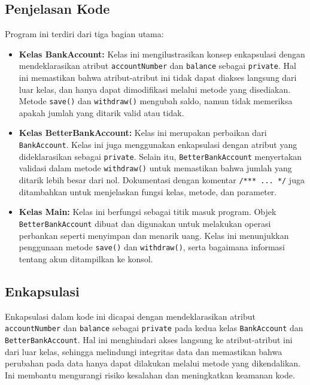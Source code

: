 \subsection{Penjelasan Kode}

Program ini terdiri dari tiga bagian utama:

\begin{itemize}
	\item \textbf{Kelas BankAccount:} Kelas ini mengilustrasikan konsep enkapsulasi dengan mendeklarasikan atribut \texttt{accountNumber} dan \texttt{balance} sebagai \texttt{private}. Hal ini memastikan bahwa atribut-atribut ini tidak dapat diakses langsung dari luar kelas, dan hanya dapat dimodifikasi melalui metode yang disediakan. Metode \texttt{save()} dan \texttt{withdraw()} mengubah saldo, namun tidak memeriksa apakah jumlah yang ditarik valid atau tidak.
	\item \textbf{Kelas BetterBankAccount:} Kelas ini merupakan perbaikan dari \texttt{BankAccount}. Kelas ini juga menggunakan enkapsulasi dengan atribut yang dideklarasikan sebagai \texttt{private}. Selain itu, \texttt{BetterBankAccount} menyertakan validasi dalam metode \texttt{withdraw()} untuk memastikan bahwa jumlah yang ditarik lebih besar dari nol. Dokumentasi dengan komentar \texttt{/*** ... */} juga ditambahkan untuk menjelaskan fungsi kelas, metode, dan parameter.
	\item \textbf{Kelas Main:} Kelas ini berfungsi sebagai titik masuk program. Objek \texttt{BetterBankAccount} dibuat dan digunakan untuk melakukan operasi perbankan seperti menyimpan dan menarik uang. Kelas ini menunjukkan penggunaan metode \texttt{save()} dan \texttt{withdraw()}, serta bagaimana informasi tentang akun ditampilkan ke konsol.
\end{itemize}

\subsection{Enkapsulasi}

Enkapsulasi dalam kode ini dicapai dengan mendeklarasikan atribut \texttt{accountNumber} dan \texttt{balance} sebagai \texttt{private} pada kedua kelas \texttt{BankAccount} dan \texttt{BetterBankAccount}. Hal ini menghindari akses langsung ke atribut-atribut ini dari luar kelas, sehingga melindungi integritas data dan memastikan bahwa perubahan pada data hanya dapat dilakukan melalui metode yang dikendalikan. Ini membantu mengurangi risiko kesalahan dan meningkatkan keamanan kode.

